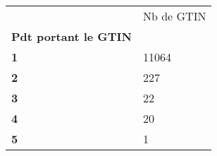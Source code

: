 \begin{tabularx}{\linewidth}{lX}
\toprule
{} &  Nb de GTIN \\
\textbf{Pdt portant le GTIN} &             \\
\midrule
\textbf{1                  } &       11064 \\
\textbf{2                  } &         227 \\
\textbf{3                  } &          22 \\
\textbf{4                  } &          20 \\
\textbf{5                  } &           1 \\
\bottomrule
\end{tabularx}
